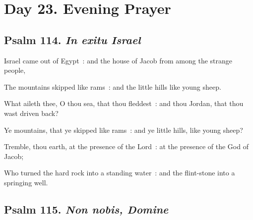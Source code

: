 \section*{Day 23. Evening Prayer}

\subsection{Psalm 114. \textit{In exitu Israel}}


 Israel came out of Egypt~: and the house of Jacob from among the strange people,\par
{}
The mountains skipped like rams~: and the little hills like young sheep.\par
{}What aileth thee, O thou sea, that thou fleddest~: and thou Jordan, that thou wast driven back?\par
{}Ye mountains, that ye skipped like rams~: and ye little hills, like young sheep?\par
{}Tremble, thou earth, at the presence of the Lord~: at the presence of the God of Jacob;\par
{}Who turned the hard rock into a standing water~: and the flint-stone into a springing well.\par

\subsection{Psalm 115. \textit{Non nobis, Domine}}


